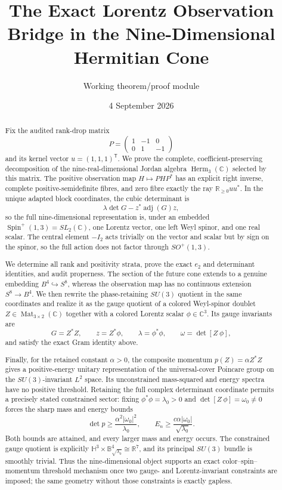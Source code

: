 \documentclass[11pt]{article}
\title{The Exact Lorentz Observation Bridge in the Nine-Dimensional Hermitian Cone}
\author{Working theorem/proof module}
\date{4 September 2026}
\theoremstyle{definition}
\newcommand{\C}{\mathbb C}
\newcommand{\R}{\mathbb R}
\newcommand{\Herm}{\operatorname{Herm}}
\newcommand{\Mat}{\operatorname{Mat}}
\newcommand{\adj}{\operatorname{adj}}
\begin{document}
\maketitle

\begin{abstract}
Fix the audited rank-drop matrix
\[
 P=\begin{pmatrix}1&-1&0\\0&1&-1\end{pmatrix}
\]
and its kernel vector $u=(1,1,1)^{\mathsf T}$.  We prove the complete, coefficient-preserving decomposition of the nine-real-dimensional Jordan algebra $\Herm_3(\C)$ selected by this matrix.  The positive observation map $H\mapsto PHP^*$ has an explicit right inverse, complete positive-semidefinite fibres, and zero fibre exactly the ray $\R_{\geq0}uu^*$.  In the unique adapted block coordinates, the cubic determinant is
\[
 \lambda\det G-z^*\adj(G)z,
\]
so the full nine-dimensional representation is, under an embedded $\operatorname{Spin}^+(1,3)=SL_2(\C)$, one Lorentz vector, one left Weyl spinor, and one real scalar.  The central element $-I_2$ acts trivially on the vector and scalar but by sign on the spinor, so the full action does not factor through $SO^+(1,3)$.

We determine all rank and positivity strata, prove the exact $e_2$ and determinant identities, and audit properness.  The section of the future cone extends to a genuine embedding $B^4\hookrightarrow S^8$, whereas the observation map has no continuous extension $S^8\to B^4$.  We then rewrite the phase-retaining $SU(3)$ quotient in the same coordinates and realize it as the gauge quotient of a colored Weyl-spinor doublet $Z\in\Mat_{3\times2}(\C)$ together with a colored Lorentz scalar $\phi\in\C^3$.  Its gauge invariants are
\[
 G=Z^*Z,\qquad z=Z^*\phi,\qquad \lambda=\phi^*\phi,
 \qquad \omega=\det[Z\ \phi],
\]
and satisfy the exact Gram identity above.

Finally, for the retained constant $\alpha>0$, the composite momentum $p(Z)=\alpha Z^*Z$ gives a positive-energy unitary representation of the universal-cover Poincare group on the $SU(3)$-invariant $L^2$ space.  Its unconstrained mass-squared and energy spectra have no positive threshold.  Retaining the full complex determinant coordinate permits a precisely stated constrained sector: fixing $\phi^*\phi=\lambda_0>0$ and $\det[Z\ \phi]=\omega_0\neq0$ forces the sharp mass and energy bounds
\[
 \det p\geq\frac{\alpha^2|\omega_0|^2}{\lambda_0},
 \qquad
 E_n\geq\frac{c\alpha|\omega_0|}{\sqrt{\lambda_0}}.
\]
Both bounds are attained, and every larger mass and energy occurs.  The constrained gauge quotient is explicitly
$\mathbb H^3\times\mathbb B^4_{\sqrt{\lambda_0}}\cong\R^7$, and its principal $SU(3)$ bundle is smoothly trivial.  Thus the nine-dimensional object supports an exact color--spin--momentum threshold mechanism once two gauge- and Lorentz-invariant constraints are imposed; the same geometry without those constraints is exactly gapless.
\end{abstract}
\end{document}

